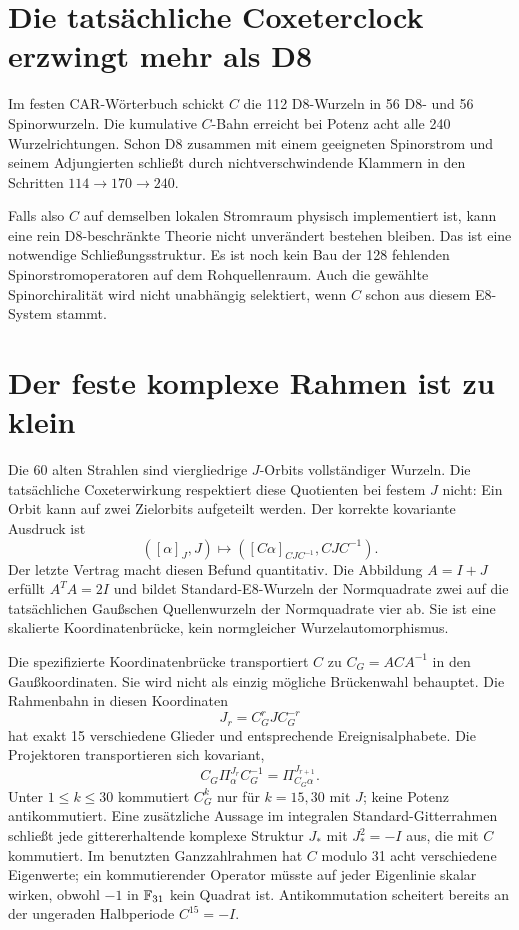 \section{Die tatsächliche Coxeterclock erzwingt mehr als D8}
Im festen CAR-Wörterbuch schickt $C$ die 112 D8-Wurzeln in 56 D8- und 56 Spinorwurzeln. Die kumulative $C$-Bahn erreicht bei Potenz acht alle 240 Wurzelrichtungen. Schon D8 zusammen mit einem geeigneten Spinorstrom und seinem Adjungierten schließt durch nichtverschwindende Klammern in den Schritten $114\to170\to240$. 

Falls also $C$ auf demselben lokalen Stromraum physisch implementiert ist, kann eine rein D8-beschränkte Theorie nicht unverändert bestehen bleiben. Das ist eine notwendige Schließungsstruktur. Es ist noch kein Bau der 128 fehlenden Spinorstromoperatoren auf dem Rohquellenraum. Auch die gewählte Spinorchiralität wird nicht unabhängig selektiert, wenn $C$ schon aus diesem E8-System stammt.

\section{Der feste komplexe Rahmen ist zu klein}
Die 60 alten Strahlen sind viergliedrige $J$-Orbits vollständiger Wurzeln. Die tatsächliche Coxeterwirkung respektiert diese Quotienten bei festem $J$ nicht: Ein Orbit kann auf zwei Zielorbits aufgeteilt werden. Der korrekte kovariante Ausdruck ist
\[
 ([\alpha]_J,J)\longmapsto
 ([C\alpha]_{CJC^{-1}},CJC^{-1}).
\]
Der letzte Vertrag macht diesen Befund quantitativ. Die Abbildung $A=I+J$ erfüllt $A^TA=2I$ und bildet Standard-E8-Wurzeln der Normquadrate zwei auf die tatsächlichen Gaußschen Quellenwurzeln der Normquadrate vier ab. Sie ist eine skalierte Koordinatenbrücke, kein normgleicher Wurzelautomorphismus. 

Die spezifizierte Koordinatenbrücke transportiert $C$ zu $C_G=ACA^{-1}$ in den Gaußkoordinaten. Sie wird nicht als einzig mögliche Brückenwahl behauptet. Die Rahmenbahn in diesen Koordinaten
\[
 J_r=C_G^rJC_G^{-r}
\]
hat exakt 15 verschiedene Glieder und entsprechende Ereignisalphabete. Die Projektoren transportieren sich kovariant,
\[
 C_G\Pi_\alpha^{J_r}C_G^{-1}=\Pi_{C_G\alpha}^{J_{r+1}}.
\]
Unter $1\le k\le30$ kommutiert $C_G^k$ nur für $k=15,30$ mit $J$; keine Potenz antikommutiert. Eine zusätzliche Aussage im integralen Standard-Gitterrahmen schließt jede gittererhaltende komplexe Struktur $J_*$ mit $J_*^2=-I$ aus, die mit $C$ kommutiert. Im benutzten Ganzzahlrahmen hat $C$ modulo 31 acht verschiedene Eigenwerte; ein kommutierender Operator müsste auf jeder Eigenlinie skalar wirken, obwohl $-1$ in $\mathbb F_{31}$ kein Quadrat ist. Antikommutation scheitert bereits an der ungeraden Halbperiode $C^{15}=-I$. 

